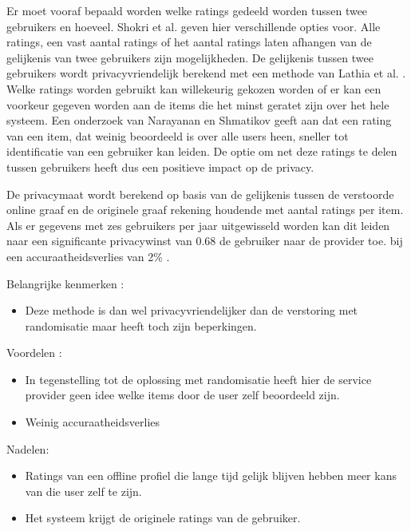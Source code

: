 Er moet vooraf bepaald worden welke ratings gedeeld worden tussen twee gebruikers en hoeveel. Shokri et al. geven hier verschillende opties voor. Alle ratings, een vast aantal ratings of het aantal ratings laten afhangen van de gelijkenis van twee gebruikers zijn mogelijkheden. De gelijkenis tussen twee gebruikers wordt privacyvriendelijk berekend met een methode van Lathia et al. \cite{lath}. Welke ratings worden gebruikt kan willekeurig gekozen worden of er kan een voorkeur gegeven worden aan de items die het minst geratet zijn over het hele systeem. Een onderzoek van Narayanan en Shmatikov \cite{nar} geeft aan dat een rating van een item, dat weinig beoordeeld is over alle users heen, sneller tot identificatie van een gebruiker kan leiden.  De optie om net deze ratings te delen tussen gebruikers heeft dus een positieve impact op de privacy.

De privacymaat wordt berekend op basis van de gelijkenis tussen de verstoorde online graaf en de originele graaf rekening houdende met aantal ratings per item. 
Als er gegevens met zes gebruikers per jaar uitgewisseld worden kan dit leiden naar een significante privacywinst van 0.68 de gebruiker naar de provider toe. bij een accuraatheidsverlies van 2\% . 


Belangrijke kenmerken :
\begin{itemize}
 
\item Deze methode is dan wel privacyvriendelijker dan de verstoring met randomisatie maar heeft toch zijn beperkingen.
\end{itemize}
Voordelen : 
\begin{itemize}
\item In tegenstelling tot de oplossing met randomisatie heeft hier de service provider geen idee welke items door de user zelf beoordeeld zijn. 
\item Weinig accuraatheidsverlies
\end{itemize}
Nadelen:
\begin{itemize}
\item Ratings van een offline profiel die lange tijd gelijk blijven hebben meer kans van die user zelf te zijn.
\item Het systeem krijgt de originele ratings van de gebruiker.

\end{itemize}
